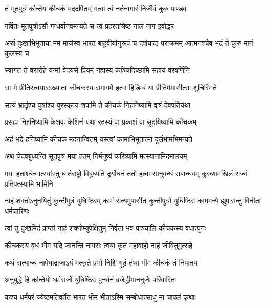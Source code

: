\twolineshloka
{तं मूतपुत्रं कौन्तेय कीचकं मददर्पितम्}
{गत्वा त्वं नर्तनागारं निर्जीवं कुरु पाण्डव}


\twolineshloka
{गर्वितः मूतपुत्रोऽसौ गन्धर्वानवमन्यते}
{स त्वं प्रहरतांश्रेष्ठ नालं नाग इवोद्धर}


\threelineshloka
{अस्रं दुःखाभिभूताया मम मार्जस्व भारत}
{बाहुवीर्यानुरूपं च दर्शयाद्य पराक्रमम्}
{आत्मनश्चैव भद्रं ते कुरु मानं कुलस्य च}




\twolineshloka
{स्वागतं ते वरारोहे यन्मां वेदयसे प्रियम्}
{नह्यस्य कञ्चिदिच्छामि सहायं वरवर्णिनि}


\twolineshloka
{सा मे प्रीतिस्त्वयाऽऽख्याता कीचकस्य समागमे}
{हत्वा हिडिम्बं या प्रीतिर्ममासीत्सा शुचिस्मिते}


\twolineshloka
{सत्यं भ्रातॄंश्च पुत्रांश्च पुरस्कृत्य शपामि ते}
{कीचकं निहनिष्यामि वृत्रं देवपतिर्यथा}


\twolineshloka
{प्रसह्य निहनिष्यामि केशवः केशिनं यथा}
{रहस्यं वा प्रकाशं वा सूदयिष्यामि कीचकम्}


\twolineshloka
{अहं भद्रे हनिष्यामि कीचकं मदनान्वितम्}
{यस्त्वां कामाभिभूतात्मा दुर्लभामभिमन्यते}


\twolineshloka
{अथ चेदवबुध्यन्ति सूतपुत्रं मया हतम्}
{निर्मनुष्यं करिष्यामि मत्स्यानामिदमालयम्}


\threelineshloka
{मया हतांश्चेन्मात्स्यांस्तु धार्तराष्ट्रो विबुध्यति}
{दुर्योधनं ततो हत्वा सानुबन्धं सबान्धवम्}
{कुरुणामखिलं राज्यं प्रतिपत्स्यामि भामिनि}


\threelineshloka
{नाहं शक्तोऽनुनयितुं कुन्तीपुत्रं युधिष्ठिरम्}
{कामं सत्यमुपासीत कुन्तीपुत्रो युधिष्ठिरः}
{काममन्ये ह्युपासन्तु विनीता धर्मचारिणः}


\twolineshloka
{त्वां तु दुःखमिदं प्राप्तां नाहं शक्नोम्युपेक्षितुम्}
{निर्वृता भव पाञ्चालि कीचकस्य वधात्पुनः}




\twolineshloka
{कीचकस्य वधं भीम यदि जानन्ति नागराः}
{त्वया कृतं महाबाहो नाहं जीवितुमुत्सहे}


\twolineshloka
{कथं सत्याच्च नापेयाद्राजाऽयं मत्कृते प्रभो}
{निशि गूढं तथा भीम कीचकं तं निपातय}


\twolineshloka
{अनुबुद्धे हि कौन्तेयो धर्मराजो युधिष्ठिरः}
{पुनर्वनं व्रजेद्धीमाननुजैः परिवारितः}


\twolineshloka
{कश्च धर्मपरं ज्येष्ठमतिवर्तेत भारत}
{भीम भीताऽस्मि सम्बोधात्साधु मा चापलं कृथाः}


